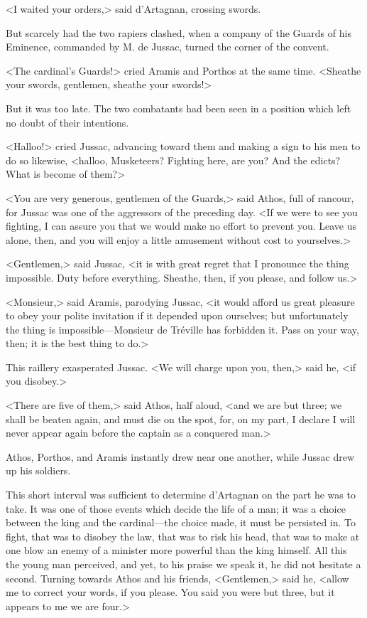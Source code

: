 <I waited your orders,> said d'Artagnan, crossing swords. 

But scarcely had the two rapiers clashed, when a company of the Guards of his Eminence, commanded by M. de Jussac, turned the corner of the convent. 

<The cardinal's Guards!> cried Aramis and Porthos at the same time. <Sheathe your swords, gentlemen, sheathe your swords!> 

But it was too late. The two combatants had been seen in a position which left no doubt of their intentions. 

<Halloo!> cried Jussac, advancing toward them and making a sign to his men to do so likewise, <halloo, Musketeers? Fighting here, are you? And the edicts? What is become of them?> 

<You are very generous, gentlemen of the Guards,> said Athos, full of rancour, for Jussac was one of the aggressors of the preceding day. <If we were to see you fighting, I can assure you that we would make no effort to prevent you. Leave us alone, then, and you will enjoy a little amusement without cost to yourselves.> 

<Gentlemen,> said Jussac, <it is with great regret that I pronounce the thing impossible. Duty before everything. Sheathe, then, if you please, and follow us.> 

<Monsieur,> said Aramis, parodying Jussac, <it would afford us great pleasure to obey your polite invitation if it depended upon ourselves; but unfortunately the thing is impossible---Monsieur de Tréville has forbidden it. Pass on your way, then; it is the best thing to do.> 

This raillery exasperated Jussac. <We will charge upon you, then,> said he, <if you disobey.> 

<There are five of them,> said Athos, half aloud, <and we are but three; we shall be beaten again, and must die on the spot, for, on my part, I declare I will never appear again before the captain as a conquered man.> 

Athos, Porthos, and Aramis instantly drew near one another, while Jussac drew up his soldiers. 

This short interval was sufficient to determine d'Artagnan on the part he was to take. It was one of those events which decide the life of a man; it was a choice between the king and the cardinal---the choice made, it must be persisted in. To fight, that was to disobey the law, that was to risk his head, that was to make at one blow an enemy of a minister more powerful than the king himself. All this the young man perceived, and yet, to his praise we speak it, he did not hesitate a second. Turning towards Athos and his friends, <Gentlemen,> said he, <allow me to correct your words, if you please. You said you were but three, but it appears to me we are four.> 


